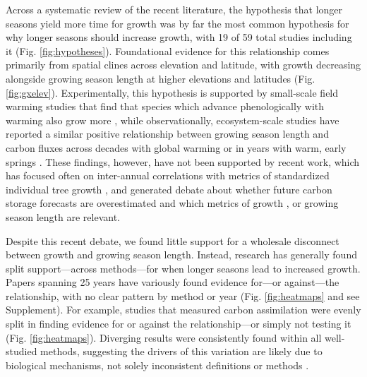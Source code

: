 \documentclass[11pt]{article}
\begin{document}
Across a systematic review of the recent literature, the hypothesis that longer seasons yield more time for growth was by far the most common hypothesis for why longer seasons should increase growth, with 19 of 59 total studies including it (Fig. \ref{fig:hypotheses}). Foundational evidence for this relationship comes primarily from spatial clines across elevation and latitude, with growth decreasing alongside growing season length at higher elevations and latitudes (Fig. \ref{fig:gxelev}). Experimentally, this hypothesis is supported by small-scale field warming studies that find that species which advance phenologically with warming also grow more \citep[][]{Cleland:2012}, while observationally, ecosystem-scale studies have reported a similar positive relationship between growing season length and carbon fluxes across decades with global warming \citep{keenan2014net} or in years with warm, early springs \citep{chen1999effects}. These findings, however, have not been supported by recent work, which has focused often on inter-annual correlations with metrics of standardized individual tree growth \citep{dow2022warm,silvestro2023longer}, and generated debate about whether future carbon storage forecasts are overestimated and which metrics of growth \citep{green2022limits}, or growing season length \citep{korner2023four} are relevant.

Despite this recent debate, we found little support for a wholesale disconnect between growth and growing season length. Instead, research has generally found split support---across methods---for when longer seasons lead to increased growth. Papers spanning 25 years have variously found evidence for---or against---the relationship, with no clear pattern by method or year (Fig. \ref{fig:heatmaps} and see Supplement). For example, studies that measured carbon assimilation were evenly split in finding evidence for or against the relationship---or simply not testing it (Fig. \ref{fig:heatmaps}). Diverging results were consistently found within all well-studied methods, suggesting the drivers of this variation are likely due to biological mechanisms, not solely inconsistent definitions or methods \citep[as some, e.g. ][have recently suggested]{green2022limits,korner2023four}. 
\end{document}
